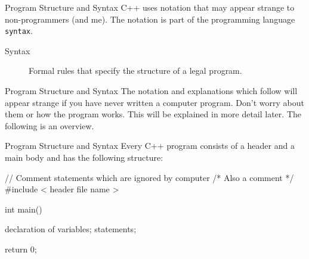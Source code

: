 \documentclass[../lecture1-introduction.tex]{subfiles}
\begin{document}

\begin{frame}[fragile]{Program Structure and Syntax}
    C++ uses notation that may appear strange to non-programmers (and me).
    The notation is part of the programming language \texttt{syntax}.
    \begin{description}
        \item [Syntax] Formal rules that specify the structure of a legal program.
    \end{description}
\end{frame}

\begin{frame}[fragile]{Program Structure and Syntax}
    The notation and explanations which follow will appear strange if you have
    never written a computer program. \newline \newline
    Don't worry about them or how the program works. This will be explained
    in more detail later. \newline \newline
    The following is an overview.
\end{frame}

\begin{frame}[fragile]{Program Structure and Syntax}
    Every C++ program consists of a header and a main body and has the following
    structure:
\begin{cppcode}[]
// Comment statements which are ignored by computer
/* Also a comment */
#include < header file name >

int main()
{
    declaration of variables;
    statements;

    return 0;
}
\end{cppcode}
\end{frame}
\end{document}
